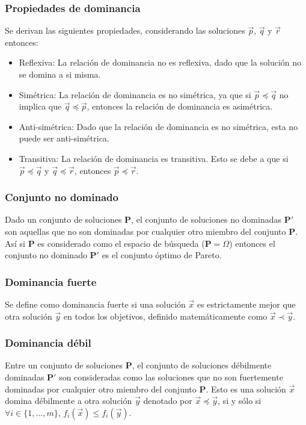 \subsubsection*{Propiedades de dominancia}
Se derivan las siguientes propiedades, considerando las soluciones $\vec{p}$, $\vec{q}$ y $\vec{r}$ entonces:
\begin{itemize}
\item Reflexiva: La relación de dominancia no es reflexiva, dado que la solución no se domina a si misma.
\item Simétrica: La relación de dominancia es no simétrica, ya que si  $ \vec{p} \preceq \vec{q}$  no implica que $\vec{q} \preceq \vec{p}$, entonces la relación de dominancia es asimétrica.
\item Anti-simétrica: Dado que la relación de dominancia es no simétrica, esta no puede ser anti-simétrica.
\item Transitiva: La relación de dominancia es transitiva. Esto se debe a que si $\vec{p} \preceq \vec{q}$ y $\vec{q} \preceq \vec{r}$, entonces $\vec{p} \preceq \vec{r}$.
\end{itemize}
\subsubsection*{Conjunto no dominado}
Dado un conjunto de soluciones $ \mathbf{P}$, el conjunto de soluciones no dominadas $\mathbf{P'}$ son aquellas que no son dominadas por cualquier otro miembro del conjunto $ \mathbf{P}$.
Así si $\mathbf{P}$ es considerado como el espacio de búsqueda ($\mathbf{P} = \Omega$) entonces el conjunto no dominado $\mathbf{P'}$ es el conjunto óptimo de Pareto.
\subsubsection*{Dominancia fuerte}
Se define como dominancia fuerte si una solución $\vec{x}$ es estrictamente mejor que otra solución $\vec{y}$ en todos los objetivos, definido matemáticamente como $ \vec{x} \prec \vec{y} $.

\subsubsection*{Dominancia débil}
Entre un conjunto de soluciones $\mathbf{P}$, el conjunto de soluciones débilmente dominadas $\mathbf{P'}$ son consideradas como las soluciones que no son fuertemente dominadas por cualquier otro miembro del conjunto $\mathbf{P}$. Esto es una soluci\'on $\vec{x}$ domina d\'ebilmente a otra soluci\'on $\vec{y}$ denotado por $\vec{x} \preceq \vec{y} $,  si y s\'olo si $\forall i \in \{1,...,m\}$, $f_i(\vec{x}) \leq f_i(\vec{y})$.
